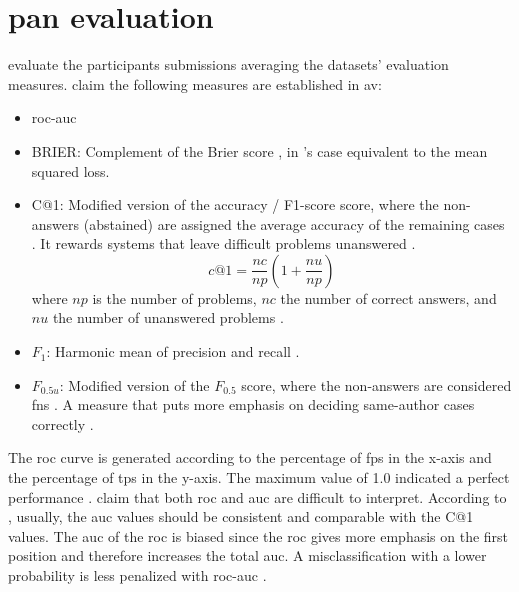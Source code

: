 \section{\acs{pan} evaluation}
\label{sec:pan_evaluation}

\citet{ayele_overview_2024,bevendorff_overview_2024} evaluate the participants submissions averaging the datasets' evaluation measures.
\citet{ayele_overview_2024} claim the following measures are established in \ac{av}:
\begin{itemize}
    \item \ac{roc-auc} \cite{bevendorff_overview_2024,weerasinghe_feature_vector_difference_2021,kocher_unine_2015}
    \item BRIER: Complement of the Brier score \cite{bevendorff_overview_2024,weerasinghe_feature_vector_difference_2021}, in \citet{bevendorff_overview_2024}'s case equivalent to the mean squared loss.
    \item C@1: Modified version of the accuracy \cite{bevendorff_overview_2024}/ F1-score \cite{weerasinghe_feature_vector_difference_2021} score, 
    where the non-answers (abstained) \cite{llm_detection_av_2025} are assigned the average accuracy of the remaining cases \cite{bevendorff_overview_2024}. 
    It rewards systems that leave difficult problems unanswered \cite{weerasinghe_feature_vector_difference_2021}.
    $$c@1 = \frac{nc}{np}(1+\frac{nu}{np})$$ where $np$ is the number of problems, $nc$ the number of correct answers, 
    and $nu$ the number of unanswered problems \cite{kocher_unine_2015}.
    \item $F_1$: Harmonic mean of precision and recall \cite{bevendorff_overview_2024,weerasinghe_feature_vector_difference_2021}.
    \item $F_{0.5u}$: Modified version of the $F_{0.5}$ score, where the non-answers are considered \acp{fn} \cite{bevendorff_overview_2024}. A measure that puts more emphasis on deciding same-author cases correctly \cite{weerasinghe_feature_vector_difference_2021}.
\end{itemize}

The \ac{roc} curve is generated according to the percentage of \acp{fp} in the x-axis and the percentage of \acp{tp} in the y-axis.
The maximum value of 1.0 indicated a perfect performance \cite{kocher_unine_2015}.
\citet{kocher_unine_2015} claim that both \ac{roc} and \ac{auc} are difficult to interpret.
According to \citet{kocher_unine_2015}, usually, the \ac{auc} values should be consistent and comparable with the C@1 values.
The \ac{auc} of the \ac{roc} is biased since the \ac{roc} gives more emphasis 
on the first position and therefore increases the total \ac{auc}.
A misclassification with a lower probability is less penalized with \ac{roc-auc} \cite{kocher_unine_2015}.